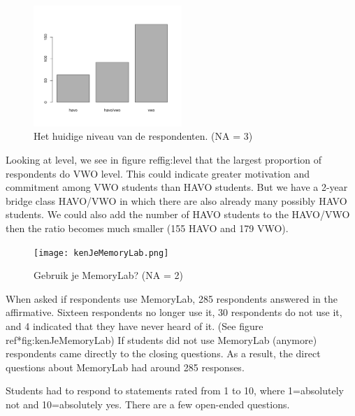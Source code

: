 \documentclass[12pt, a4paper]{article}
\begin{document}
\begin{figure}[h]
    \centering
    \includegraphics[width=0.5\textwidth]{niveau.png}
    \caption{Het huidige niveau van de respondenten. (NA = 3)}
    \label{fig:niveau}
    \end{figure}

Looking at level, we see in figure ref{fig:level} that the largest proportion of respondents do VWO level. This could indicate greater motivation and commitment among VWO students than HAVO students. But we have a 2-year bridge class HAVO/VWO in which there are also already many possibly HAVO students. We could also add the number of HAVO students to the HAVO/VWO then the ratio becomes much smaller (155 HAVO and 179 VWO).

\begin{figure}[h]
    \centering
    \texttt{[image: kenJeMemoryLab.png]}
    \caption{Gebruik je MemoryLab? (NA = 2)}
    \label{fig:kenJeMemoryLab}
    \end{figure}
When asked if respondents use MemoryLab, 285 respondents answered in the affirmative. Sixteen respondents no longer use it, 30 respondents do not use it, and 4 indicated that they have never heard of it. (See figure ref*{fig:kenJeMemoryLab}) If students did not use MemoryLab (anymore) respondents came directly to the closing questions. As a result, the direct questions about MemoryLab had around 285 responses.

Students had to respond to statements rated from 1 to 10, where 1=absolutely not and 10=absolutely yes. There are a few open-ended questions.
\end{document}
